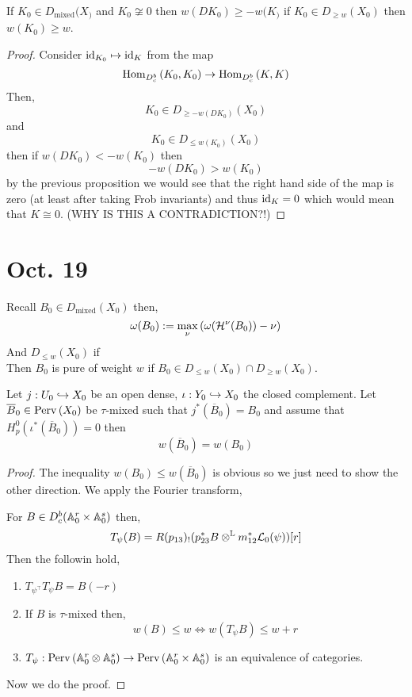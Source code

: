 \documentclass[12pt]{article}
\begin{document}
\begin{cor}
If $K_0 \in D_{\text{mixed}}(X_)$ and $K_0 \not\cong 0$ then $w(D K_0) \ge - w(K_)$ if $K_0 \in D_{\ge w}(X_0)$ then $w(K_0) \ge w$.
\end{cor}

\begin{proof}
Consider $\mathrm{id}_{K_0} \mapsto \mathrm{id}_K$ from the map
\[ \mathrm{Hom}_{D^b_c} \left( K_0, K_0 \right) \to \mathrm{Hom}_{D^b_c} \left( K, K \right) \]
Then,
\[ K_0 \in D_{\ge -w(DK_0)}(X_0) \]
and
\[ K_0 \in D_{\le w(K_0)}(X_0) \]
then if $w(D K_0) < - w(K_0)$ then
\[ - w(D K_0) > w(K_0) \]
by the previous proposition we would see that the right hand side of the map is zero (at least after taking Frob invariants) and thus $\mathrm{id}_K = 0$ which would mean that $K \cong 0$. (WHY IS THIS A CONTRADICTION?!)
\end{proof}

\section{Oct. 19}

Recall $B_0 \in D_{\text{mixed}}(X_0)$ then,
\[ \omega(B_0) := \max_{\nu} \left( \omega(\mathcal{H}^\nu(B_0)) - \nu \right) \]
And $D_{\le w}(X_0)$ if 
\bigskip\\
Then $B_0$ is pure of weight $w$ if $B_0 \in D_{\le w}(X_0) \cap D_{\ge w}(X_0)$.

\begin{lemma}
Let $j : U_0 \hookrightarrow X_0$ be an open dense, $\iota : Y_0 \hookrightarrow X_0$ the closed complement. Let $\overline{B}_0 \in \mathrm{Perv}\left( X_0 \right)$ be $\tau$-mixed such that $j^*(\overline{B}_0) = B_0$ and assume that $H_p^0(\iota^* (\overline{B}_0)) = 0$ then
\[ w(\overline{B}_0) = w(B_0) \]
\end{lemma}

\begin{proof}
The inequality $w(B_0) \le w(\overline{B}_0)$ is obvious so we just need to show the other direction. We apply the Fourier transform,
\begin{center}
\end{center}
For $B \in D_c^b(\mathbb{A}_0^r \times \mathbb{A}_0^s)$ then,
\[ T_\psi(B) = R (p_{13})_! (p_{23}^* B \otimes^{\mathbb{L}} m_{12}^* \mathcal{L}_0(\psi))[r] \]
Then the followin hold,
\begin{enumerate}
\item $T_{\psi^\top} T_{\psi} B = B(-r)$
\item If $B$ is $\tau$-mixed then,
\[ w(B) \le w \iff w(T_\psi B) \le w + r \]
\item $T_\psi : \mathrm{Perv}\left( \mathbb{A}_0^r \otimes \mathbb{A}_0^s \right) \to \mathrm{Perv}\left( \mathbb{A}_0^r \times \mathbb{A}_0^s \right)$ is an equivalence of categories.
\end{enumerate}
Now we do the proof.
\end{proof}
\end{document}
